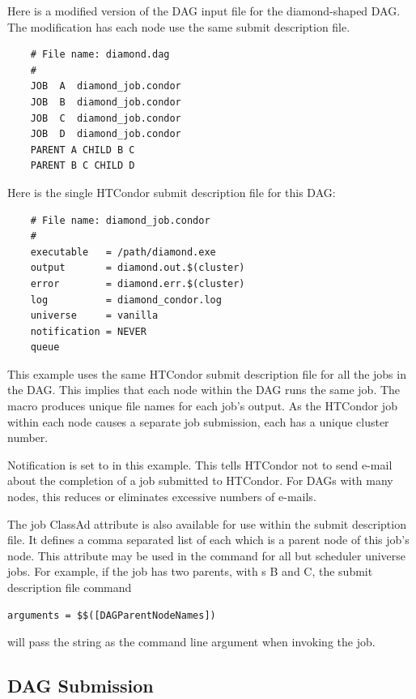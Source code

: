 Here is a modified version of the DAG input file
for the diamond-shaped DAG. 
The modification has each node use the same 
submit description file.

\begin{verbatim}
    # File name: diamond.dag
    #
    JOB  A  diamond_job.condor 
    JOB  B  diamond_job.condor 
    JOB  C  diamond_job.condor	
    JOB  D  diamond_job.condor
    PARENT A CHILD B C
    PARENT B C CHILD D
\end{verbatim}

Here is the single HTCondor submit description file
for this DAG:

\begin{verbatim}
    # File name: diamond_job.condor
    #
    executable   = /path/diamond.exe
    output       = diamond.out.$(cluster)
    error        = diamond.err.$(cluster)
    log          = diamond_condor.log
    universe     = vanilla
    notification = NEVER
    queue
\end{verbatim}

This example uses the same HTCondor submit description file
for all the jobs in the DAG.
This implies that each node within the DAG runs the
same job.
The  macro
produces unique file names for each job's output.
As the HTCondor job within each node
causes a separate job submission, each has a unique cluster number.

Notification is set to \verb@NEVER@ in this example.
This tells HTCondor not to send e-mail about the completion of a job
submitted to HTCondor.
For DAGs with many nodes, this
reduces or eliminates excessive numbers of e-mails.

The job ClassAd attribute  is also available
for use within the submit description file. 
It defines a comma separated list of each 
which is a parent node of this job's node.
This attribute may be used in the  command
for all but scheduler universe jobs.
For example, if the job has two parents, with s B and C,
the submit description file command
\begin{verbatim}
arguments = $$([DAGParentNodeNames])
\end{verbatim}
will pass the string  as the command line argument when invoking
the job.

\subsection{\label{dagman:submitdag}DAG Submission}

